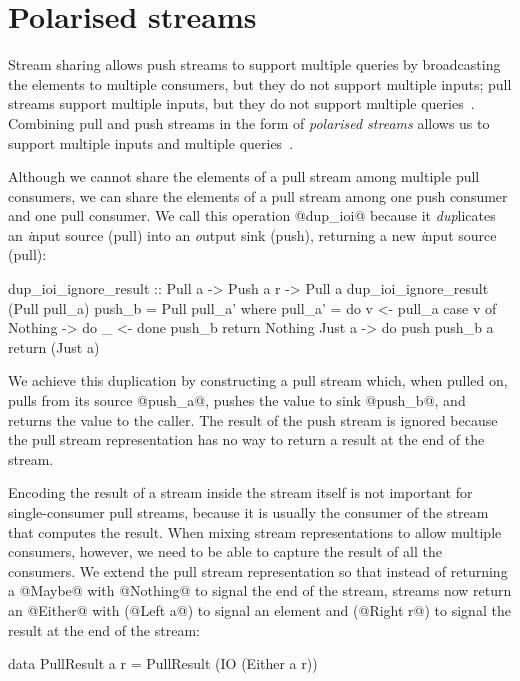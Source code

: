\section{Polarised streams}
\label{taxonomy/polarised}

Stream sharing allows push streams to support multiple queries by broadcasting the elements to multiple consumers, but they do not support multiple inputs; pull streams support multiple inputs, but they do not support multiple queries~\citep{kay2009you}.
Combining pull and push streams in the form of \emph{polarised streams} allows us to support multiple inputs and multiple queries~\citep{lippmeier2016polarized}.


Although we cannot share the elements of a pull stream among multiple pull consumers, we can share the elements of a pull stream among one push consumer and one pull consumer.
We call this operation @dup_ioi@ because it \emph{dup}licates an \emph{i}nput source (pull) into an \emph{o}utput sink (push), returning a new \emph{i}nput source (pull):

\begin{haskell}
dup_ioi_ignore_result :: Pull a -> Push a r -> Pull a
dup_ioi_ignore_result (Pull pull_a) push_b = Pull pull_a'
 where
  pull_a' = do
    v <- pull_a
    case v of
     Nothing -> do
      _ <- done push_b
      return Nothing
     Just a -> do
      push push_b a
      return (Just a)
\end{haskell}

We achieve this duplication by constructing a pull stream which, when pulled on, pulls from its source @push_a@, pushes the value to sink @push_b@, and returns the value to the caller.
The result of the push stream is ignored because the pull stream representation has no way to return a result at the end of the stream.

Encoding the result of a stream inside the stream itself is not important for single-consumer pull streams, because it is usually the consumer of the stream that computes the result.
When mixing stream representations to allow multiple consumers, however, we need to be able to capture the result of all the consumers.
We extend the pull stream representation so that instead of returning a @Maybe@ with @Nothing@ to signal the end of the stream, streams now return an @Either@ with (@Left a@) to signal an element and (@Right r@) to signal the result at the end of the stream:

\begin{haskell}
data PullResult a r = PullResult (IO (Either a r))
\end{haskell}


